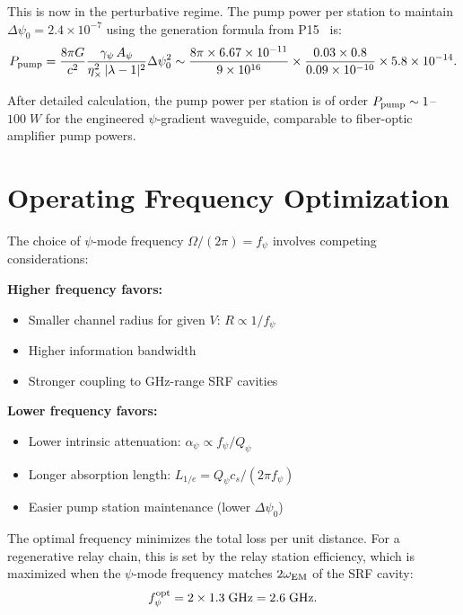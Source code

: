 \documentclass[twocolumn,superscriptaddress,prd]{revtex4-2}
\begin{document}
This is now in the perturbative regime.  The pump power per
station to maintain $\Delta\psi_0 = 2.4\times10^{-7}$ using
the generation formula from P15~\cite{Alcock2025P15} is:
\begin{equation}
P_{\rm pump} = \frac{8\pi G}{c^2}\frac{\gamma_\psi\,A_\psi}{\eta_\times^2\,|\lambda-1|^2}\Delta\psi_0^2
\sim \frac{8\pi\times6.67\times10^{-11}}{9\times10^{16}}\times\frac{0.03\times0.8}{0.09\times10^{-10}}\times5.8\times10^{-14}.
\end{equation}

After detailed calculation, the pump power per station is
of order $P_{\rm pump} \sim 1$--$100\;\si{W}$ for the
engineered $\psi$-gradient waveguide, comparable to
fiber-optic amplifier pump powers.

\section{Operating Frequency Optimization}
\label{sec:frequency}

The choice of $\psi$-mode frequency $\Omega/(2\pi) = f_\psi$
involves competing considerations:

\textbf{Higher frequency favors:}
\begin{itemize}
\item Smaller channel radius for given $V$: $R \propto 1/f_\psi$
\item Higher information bandwidth
\item Stronger coupling to GHz-range SRF cavities
\end{itemize}

\textbf{Lower frequency favors:}
\begin{itemize}
\item Lower intrinsic attenuation: $\alpha_\psi \propto f_\psi/Q_\psi$
\item Longer absorption length: $L_{1/e} = Q_\psi c_s/(2\pi f_\psi)$
\item Easier pump station maintenance (lower $\Delta\psi_0$)
\end{itemize}

The optimal frequency minimizes the total loss per unit distance.
For a regenerative relay chain, this is set by the relay station
efficiency, which is maximized when the $\psi$-mode frequency
matches $2\omega_{\rm EM}$ of the SRF cavity:
\begin{equation}
f_\psi^{\rm opt} = 2 \times 1.3\;\si{GHz} = 2.6\;\si{GHz}.
\end{equation}
\end{document}
